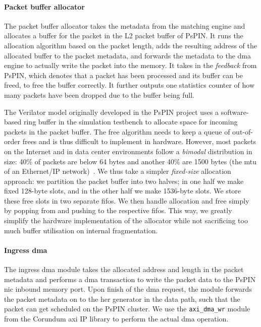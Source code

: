
\paragraph{Packet buffer allocator} The packet buffer allocator takes the metadata from the matching engine and allocates a buffer for the packet in the L2 packet buffer of PsPIN.  It runs the allocation algorithm based on the packet length, adds the resulting address of the allocated buffer to the packet metadata, and forwards the metadata to the \ac{dma} engine to actually write the packet into the memory.  It takes in the \emph{feedback} from PsPIN, which denotes that a packet has been processed and its buffer can be freed, to free the buffer correctly.  It further outputs one statistics counter of how many packets have been dropped due to the buffer being full.

The Verilator model originally developed in the PsPIN project uses a software-based ring buffer in the simulation testbench to allocate space for incoming packets in the packet buffer.  The free algorithm needs to keep a queue of out-of-order frees and is thus difficult to implement in hardware.  However, most packets on the Internet and in data center environments follow a \emph{bimodal} distribution in size: 40\% of packets are below 64 bytes and another 40\% are 1500 bytes (the \ac{mtu} of an Ethernet/IP network)~\cite{john_analysis_2007,benson_understanding_2009}.  We thus take a simpler \emph{fixed-size} allocation approach: we partition the packet buffer into two halves; in one half we make fixed 128-byte slots, and in the other half we make 1536-byte slots.  We store these free slots in two separate \ac{fifo}s.  We then handle allocation and free simply by popping from and pushing to the respective \ac{fifo}s.  This way, we greatly simplify the hardware implementation of the allocator while not sacrificing too much buffer utilisation on internal fragmentation.


\paragraph{Ingress \ac{dma}} The ingress \ac{dma} module takes the allocated address and length in the packet metadata and performs a \ac{dma} transaction to write the packet data to the PsPIN \ac{nic} inbound memory port.  Upon finish of the \ac{dma} request, the module forwards the packet metadata on to the \ac{her} generator in the data path, such that the packet can get scheduled on the PsPIN cluster.  We use the \texttt{axi\_\-dma\_\-wr} module from the Corundum \ac{axi} IP library to perform the actual \ac{dma} operation.

